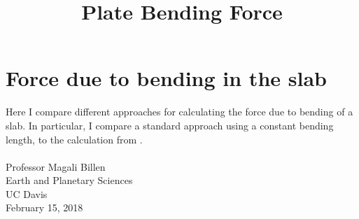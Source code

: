 \documentclass[11pt]{article}
\title{Plate Bending Force}
\begin{document}
    
    
    \maketitle
    
    

    
    \hypertarget{force-due-to-bending-in-the-slab}{%
\section{Force due to bending in the
slab}\label{force-due-to-bending-in-the-slab}}

Here I compare different approaches for calculating the force due to
bending of a slab. In particular, I compare a standard approach using a
constant bending length, to the calculation from \citet{ribe_gji10}.\\
\ \\
Professor Magali Billen\\
 Earth and Planetary Sciences \\
 UC Davis \\
 February 15, 2018 
\end{document}
